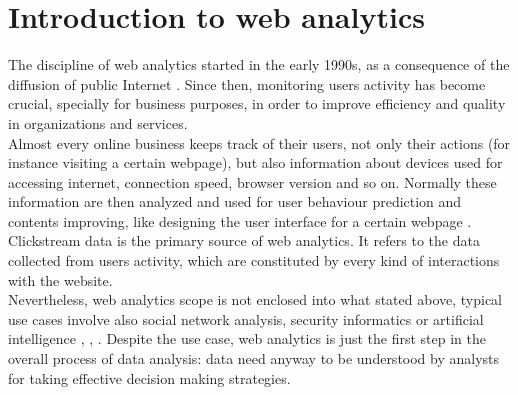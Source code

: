 \section{Introduction to web analytics}
The discipline of web analytics started in the early 1990s, as a consequence of the diffusion of public Internet \cite{bib13}. Since then, monitoring users activity has become crucial, specially for business purposes, in order to improve efficiency and quality in organizations and services. \\Almost every online business keeps track of their users, not only their actions (for instance visiting a certain webpage), but also information about devices used for accessing internet, connection speed, browser version and so on. Normally these information are then analyzed and used for user behaviour prediction and contents improving, like designing the user interface for a certain webpage \cite{bib14}. Clickstream data is the primary source of web analytics. It refers to the data collected from users activity, which are constituted by every kind of interactions with the website.\\
Nevertheless, web analytics scope is not enclosed into what stated above, typical use cases involve also social network analysis, security informatics or artificial intelligence \cite{bib15}, \cite{bib16}, \cite{bib30}. Despite the use case, web analytics is just the first step in the overall process of data analysis: data need anyway to be understood by analysts for taking effective decision making strategies.

